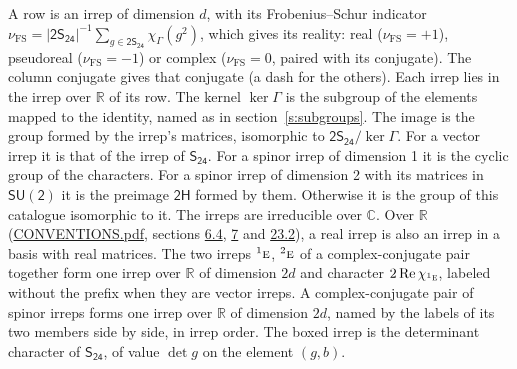 \documentclass[10pt,a4paper]{article}
\numberwithin{equation}{section}
\newcommand{\grp}[1]{\mathsf{#1}}
\newcommand{\irr}[1]{\text{\normalfont\scshape #1}}
\newcommand{\conjpair}[1]{{}^{#1}}
\newcommand{\irchar}[1]{\chi_{#1}}
\newcommand{\fsind}{\nu_{\mathrm{FS}}}
\begin{document}
\leavevmode\label{n:index.frobenius}\label{n:head.irrep}\label{n:head.reality}A row is an irrep of dimension $d$, with its Frobenius--Schur indicator $\fsind = |\grp{2S_{24}}|^{-1}\allowbreak\sum_{g\in\grp{2S_{24}}}\irchar{\Gamma}(g^2)$, which gives its reality: real ($\fsind = +1$), pseudoreal ($\fsind = -1$) or complex ($\fsind = 0$, paired with its conjugate). \label{n:head.conjugate}The column conjugate gives that conjugate (a dash for the others). \label{n:head.over.real}Each irrep lies in the irrep over $\mathbb{R}$ of its row. \label{n:head.kernel}The kernel $\ker\Gamma$ is the subgroup of the elements mapped to the identity, named as in section~\ref{s:subgroups}. \label{n:head.image}The image is the group formed by the irrep's matrices, isomorphic to $\grp{2S_{24}}/\ker\Gamma$. For a vector irrep it is that of the irrep of \href{../../../rotation/data/pdf/S24.pdf}{$\grp{S_{24}}$}. For a spinor irrep of dimension 1 it is the cyclic group of the characters. For a spinor irrep of dimension 2 with its matrices in $\grp{SU(2)}$ it is the preimage $\grp{2H}$ formed by them. Otherwise it is the group of this catalogue isomorphic to it. The irreps are irreducible over $\mathbb{C}$. Over $\mathbb{R}$ (\href{../../CONVENTIONS.pdf}{CONVENTIONS.pdf}, sections \href{../../../rotation/CONVENTIONS.pdf\#conv.6.4}{6.4}, \href{../../../rotation/CONVENTIONS.pdf\#conv.7}{7} and \href{../../CONVENTIONS.pdf\#conv.23.2}{23.2}), a real irrep is also an irrep in a basis with real matrices. The two irreps $\conjpair{1}\irr{e}$, $\conjpair{2}\irr{e}$ of a complex-conjugate pair together form one irrep over $\mathbb{R}$ of dimension $2d$ and character $2\operatorname{Re}\irchar{\conjpair{1}\irr{e}}$, labeled without the prefix when they are vector irreps. A complex-conjugate pair of spinor irreps forms one irrep over $\mathbb{R}$ of dimension $2d$, named by the labels of its two members side by side, in irrep order. \label{n:mark.determinant}The boxed irrep is the determinant character of \href{../../../rotation/data/pdf/S24.pdf}{$\grp{S_{24}}$}, of value $\det g$ on the element $(g, b)$.
\setlength{\emergencystretch}{2em}\par\setlength{\emergencystretch}{0pt}
\end{document}
